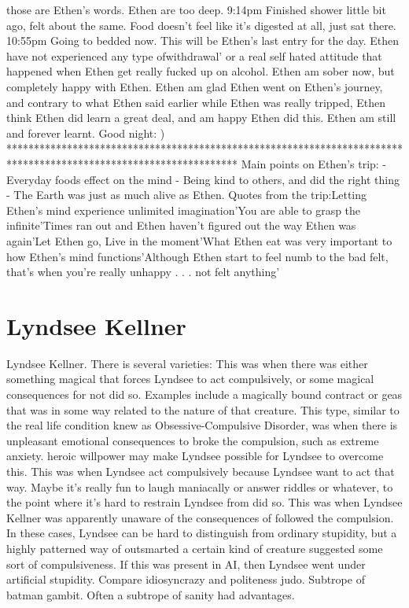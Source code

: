 \documentclass[12pt]{book}
\begin{document}
those are Ethen's words. Ethen are too deep. 9:14pm Finished shower little bit ago, felt about the same. Food doesn't feel like it's digested at all, just sat there. 10:55pm Going to bedded now. This will be Ethen's last entry for the day. Ethen have not experienced any type ofwithdrawal' or a real self hated attitude that happened when Ethen get really fucked up on alcohol. Ethen am sober now, but completely happy with Ethen. Ethen am glad Ethen went on Ethen's journey, and contrary to what Ethen said earlier while Ethen was really tripped, Ethen think Ethen did learn a great deal, and am happy Ethen did this. Ethen am still and forever learnt. Good night: ) ****************************************************************************************************************** Main points on Ethen's trip: - Everyday foods effect on the mind - Being kind to others, and did the right thing - The Earth was just as much alive as Ethen. Quotes from the trip:Letting Ethen's mind experience unlimited imagination'You are able to grasp the infinite'Times ran out and Ethen haven't figured out the way Ethen was again'Let Ethen go, Live in the moment'What Ethen eat was very important to how Ethen's mind functions'Although Ethen start to feel numb to the bad felt, that's when you're really unhappy . . .  not felt anything'



\chapter{Lyndsee Kellner}

Lyndsee Kellner. There is several varieties: This was when there was either something magical that forces Lyndsee to act compulsively, or some magical consequences for not did so. Examples include a magically bound contract or geas that was in some way related to the nature of that creature. This type, similar to the real life condition knew as Obsessive-Compulsive Disorder, was when there is unpleasant emotional consequences to broke the compulsion, such as extreme anxiety. heroic willpower may make Lyndsee possible for Lyndsee to overcome this. This was when Lyndsee act compulsively because Lyndsee want to act that way. Maybe it's really fun to laugh maniacally or answer riddles or whatever, to the point where it's hard to restrain Lyndsee from did so. This was when Lyndsee Kellner was apparently unaware of the consequences of followed the compulsion. In these cases, Lyndsee can be hard to distinguish from ordinary stupidity, but a highly patterned way of outsmarted a certain kind of creature suggested some sort of compulsiveness. If this was present in AI, then Lyndsee went under artificial stupidity. Compare idiosyncrazy and politeness judo. Subtrope of batman gambit. Often a subtrope of sanity had advantages.
\end{document}
